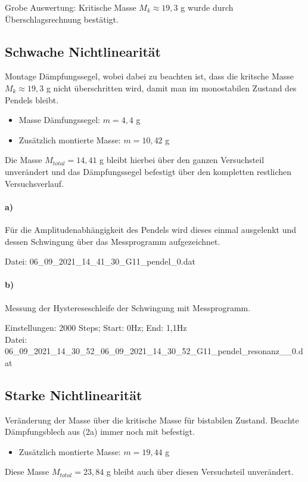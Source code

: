 Grobe Auswertung: Kritische Masse $M_k\approx19,3$ g wurde durch Überschlagsrechnung bestätigt.

\subsection*{Schwache Nichtlinearität}
\label{sub:weakLin}
Montage Dämpfungssegel, wobei dabei zu beachten ist, dass die kritsche Masse $M_k\approx19,3$ g nicht überschritten wird, damit man im monostabilen Zustand des Pendels bleibt.
\begin{itemize}
    \item Masse Dämfungssegel: $m=4,4$ g
    \item Zusätzlich montierte Masse: $m = 10,42$ g
\end{itemize}
Die Masse $M_{total}= 14,41$ g bleibt hierbei über den ganzen Versuchsteil unverändert und das Dämpfungssegel befestigt über den kompletten restlichen Versuchsverlauf.
\paragraph{a)}
Für die Amplitudenabhängigkeit des Pendels wird dieses einmal ausgelenkt und dessen Schwingung über das Messprogramm aufgezeichnet.

Datei: 06\_09\_2021\_14\_41\_30\_G11\_pendel\_0.dat

\paragraph{b)}
Messung der Hystereseschleife der Schwingung mit Messprogramm.

Einstellungen: 2000 Steps; Start: 0Hz; End: 1,1Hz\\
Datei: 06\_09\_2021\_14\_30\_52\_06\_09\_2021\_14\_30\_52\_G11\_pendel\_resonanz\_\_0.dat\\

\subsection*{Starke Nichtlinearität}
\label{sub:strongLin}
Veränderung der Masse über die kritische Masse für bistabilen Zustand. Beachte Dämpfungsblech aus (2a) immer noch mit befestigt.
\begin{itemize}
    \item Zusätzlich montierte Masse: $m = 19,44$ g
\end{itemize}
Diese Masse $M_{total}=23,84$ g bleibt auch über diesen Versuchsteil unverändert.

